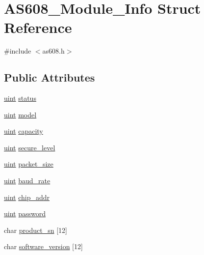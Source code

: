 \hypertarget{struct_a_s608___module___info}{}\section{A\+S608\+\_\+\+Module\+\_\+\+Info Struct Reference}
\label{struct_a_s608___module___info}


{\ttfamily \#include $<$as608.\+h$>$}

\subsection*{Public Attributes}
\begin{DoxyCompactItemize}
\item 
\hyperlink{as608_8h_a91ad9478d81a7aaf2593e8d9c3d06a14}{uint} \hyperlink{struct_a_s608___module___info_a3496aaef2379cc60f7e2ef45eb196830}{status}
\item 
\hyperlink{as608_8h_a91ad9478d81a7aaf2593e8d9c3d06a14}{uint} \hyperlink{struct_a_s608___module___info_a27a96c1834487a3bfdf3d80fba35a913}{model}
\item 
\hyperlink{as608_8h_a91ad9478d81a7aaf2593e8d9c3d06a14}{uint} \hyperlink{struct_a_s608___module___info_a3f5943e11898aee4cc8bc4a1eece27bd}{capacity}
\item 
\hyperlink{as608_8h_a91ad9478d81a7aaf2593e8d9c3d06a14}{uint} \hyperlink{struct_a_s608___module___info_aba1374610650e703373b402d4c863dd6}{secure\+\_\+level}
\item 
\hyperlink{as608_8h_a91ad9478d81a7aaf2593e8d9c3d06a14}{uint} \hyperlink{struct_a_s608___module___info_a0924ce9a03a95a6084b7c09ab1e69592}{packet\+\_\+size}
\item 
\hyperlink{as608_8h_a91ad9478d81a7aaf2593e8d9c3d06a14}{uint} \hyperlink{struct_a_s608___module___info_ab605bb8a774c8e3e2557ce31b0637bf3}{baud\+\_\+rate}
\item 
\hyperlink{as608_8h_a91ad9478d81a7aaf2593e8d9c3d06a14}{uint} \hyperlink{struct_a_s608___module___info_a7b0ca4673c3fffc7ffd18beeca2601b0}{chip\+\_\+addr}
\item 
\hyperlink{as608_8h_a91ad9478d81a7aaf2593e8d9c3d06a14}{uint} \hyperlink{struct_a_s608___module___info_a2cb51d638f77fcab76688971f05b7fb3}{password}
\item 
char \hyperlink{struct_a_s608___module___info_a038de471bf65dcdb9943a82326715188}{product\+\_\+sn} \mbox{[}12\mbox{]}
\item 
char \hyperlink{struct_a_s608___module___info_a04a2be6b3d910c93ad23b6685ff36ea9}{software\+\_\+version} \mbox{[}12\mbox{]}

\end{DoxyCompactItemize}
